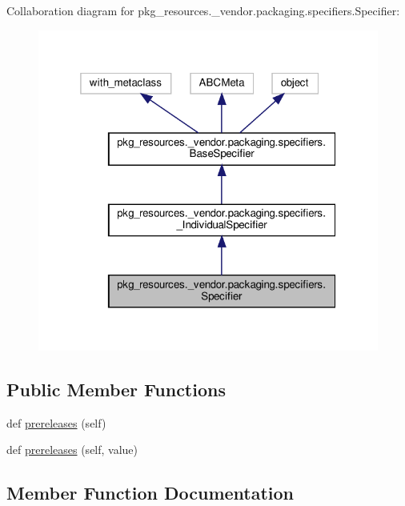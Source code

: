 Collaboration diagram for pkg\+\_\+resources.\+\_\+vendor.\+packaging.\+specifiers.\+Specifier\+:
\nopagebreak
\begin{figure}[H]
\begin{center}
\leavevmode
\includegraphics[width=319pt]{classpkg__resources_1_1__vendor_1_1packaging_1_1specifiers_1_1Specifier__coll__graph}
\end{center}
\end{figure}
\subsection*{Public Member Functions}
\begin{DoxyCompactItemize}
\item 
def \hyperlink{classpkg__resources_1_1__vendor_1_1packaging_1_1specifiers_1_1Specifier_abb830c166bbec21e1ec2e4c57f74a68a}{prereleases} (self)
\item 
def \hyperlink{classpkg__resources_1_1__vendor_1_1packaging_1_1specifiers_1_1Specifier_a29812ecb424a2dbbaddc7fcd95771f82}{prereleases} (self, value)
\end{DoxyCompactItemize}


\subsection{Member Function Documentation}
\mbox{\label{classpkg__resources_1_1__vendor_1_1packaging_1_1specifiers_1_1Specifier_abb830c166bbec21e1ec2e4c57f74a68a}} 
